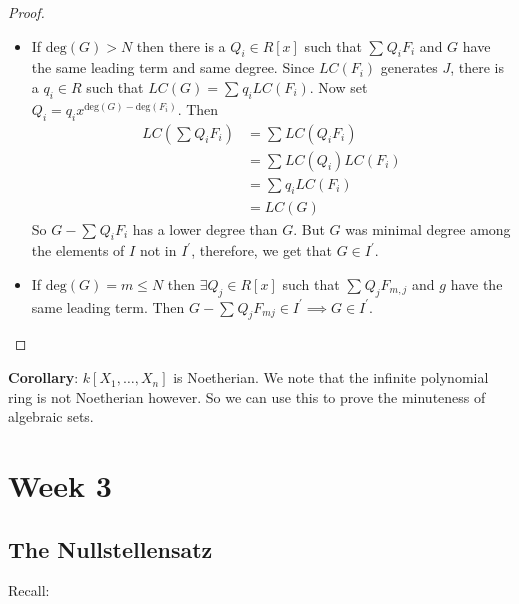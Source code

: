 \documentclass{report}
\begin{document}
\begin{proof}
\begin{itemize}
                \item If $\text{deg}(G) > N$ then there is a $Q_{i} \in R[x]$ such that $\sum_{}^{} Q_{i}F_{i}$ and $G$ have the same leading term and same degree.  Since $LC(F_{i})$ generates $J$, there is a $q_{i} \in R$ such that $LC(G) = \sum_{}^{} q_{i}LC(F_{i})$. Now set $Q_{i} = q_{i}x^{\text{deg}(G) - \text{deg}(F_{i})}$. Then 
                    \begin{align*}
                        LC(\sum_{}^{} Q_{i}F_{i}) &= \sum_{}^{} LC(Q_{i}F_{i})     \\
                                                  &= \sum_{}^{} LC(Q_{i})LC(F_{i}) \\
                                                  &= \sum_{}^{} q_{i}LC(F_{i})     \\
                                                  &= LC(G)                           
                    \end{align*}
                So $G - \sum_{}^{} Q_{i}F_{i}$ has a lower degree than $G$. But $G$ was minimal degree among the elements of $I$ not in $I^{\prime}$, therefore, we get that $G \in I^{\prime}$.

                \item If $\text{deg}(G) = m \leq N$ then $\exists Q_{j} \in R[x]$ such that $\sum_{}^{} Q_{j}F_{m, j}$ and $g$ have the same leading term. Then $G - \sum_{}^{} Q_{j}F_{mj} \in I^{\prime} \implies G \in I^{\prime}$.
            \end{itemize}
    \end{proof}
\textbf{Corollary}: $k[X_{1}, \ldots, X_{n}]$ is Noetherian. We note that the infinite polynomial ring is not Noetherian however. So we can use this to prove the minuteness of algebraic sets.

\chapter{Week 3}

\begin{topic}
    \section{The Nullstellensatz}
\end{topic}

Recall:
    \begin{center}
    \end{center}
\end{document}
